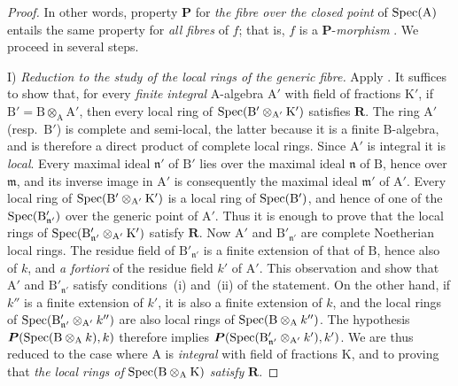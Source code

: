 \begin{proof}
In other words, property $\boldsymbol{P}$ for \emph{the fibre over the closed point} of $\operatorname{Spec}(\mathrm{A})$ entails the same property for \emph{all fibres} of $f$; that is, $f$ is a $\boldsymbol{P}$-\emph{morphism} . We proceed in several steps.

I) \emph{Reduction to the study of the local rings of the generic fibre.} Apply . It suffices to show that, for every \emph{finite} \emph{integral} $\mathrm{A}$-algebra $\mathrm{A}'$ with field of fractions $\mathrm{K}'$, if $\mathrm{B}'=\mathrm{B}\otimes_\mathrm{A}\mathrm{A}'$, then every local ring of $\operatorname{Spec}(\mathrm{B}'\otimes_{\mathrm{A}'}\mathrm{K}')$ satisfies $\boldsymbol{R}$. The ring $\mathrm{A}'$ (resp.\ $\mathrm{B}'$) is complete and semi-local, the latter because it is a finite $\mathrm{B}$-algebra, and is therefore a direct product of complete local rings. Since $\mathrm{A}'$ is integral it is \emph{local}. Every maximal ideal $\mathfrak{n}'$ of $\mathrm{B}'$ lies over the maximal ideal $\mathfrak{n}$ of $\mathrm{B}$, hence over $\mathfrak{m}$, and its inverse image in $\mathrm{A}'$ is consequently the maximal ideal $\mathfrak{m}'$ of $\mathrm{A}'$. Every local ring of $\operatorname{Spec}(\mathrm{B}'\otimes_{\mathrm{A}'}\mathrm{K}')$ is a local ring of $\operatorname{Spec}(\mathrm{B}')$, and hence of one of the $\operatorname{Spec}(\mathrm{B}'_{\mathfrak{n}'})$ over the generic point of $\mathrm{A}'$. Thus it is enough to prove that the local rings of $\operatorname{Spec}(\mathrm{B}'_{\mathfrak{n}'}\otimes_{\mathrm{A}'}\mathrm{K}')$
satisfy $\boldsymbol{R}$. Now $\mathrm{A}'$ and $\mathrm{B}'_{\mathfrak{n}'}$ are complete Noetherian local rings. The residue field of $\mathrm{B}'_{\mathfrak{n}'}$ is a finite extension of that of $\mathrm{B}$, hence also of $k$, and \emph{a fortiori} of the residue field $k'$ of $\mathrm{A}'$. This observation and  show that $\mathrm{A}'$ and $\mathrm{B}'_{\mathfrak{n}'}$ satisfy conditions~(i) and~(ii) of the statement. On the other hand, if $k''$ is a finite extension of $k'$, it is also a finite extension of $k$, and the local rings of $\operatorname{Spec}(\mathrm{B}'_{\mathfrak{n}'}\otimes_{\mathrm{A}'}k'')$
are also local rings of $\operatorname{Spec}(\mathrm{B}\otimes_\mathrm{A}k'')$. The hypothesis $\boldsymbol{P}(\operatorname{Spec}(\mathrm{B}\otimes_\mathrm{A}k),k)$ therefore implies $\boldsymbol{P}(\operatorname{Spec}(\mathrm{B}'_{\mathfrak{n}'}\otimes_{\mathrm{A}'}k'),k')$.
We are thus reduced to the case where $\mathrm{A}$ is \emph{integral} with field of fractions $\mathrm{K}$, and to proving that \emph{the local rings of} $\operatorname{Spec}(\mathrm{B}\otimes_\mathrm{A}\mathrm{K})$ \emph{satisfy} $\boldsymbol{R}$.


\end{proof}
